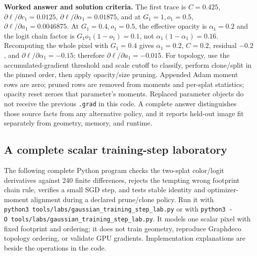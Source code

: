 \textbf{Worked answer and solution criteria.} The first trace is \(C=0.425\), \(\partial\ell/\partial c_1=0.0125\), \(\partial\ell/\partial\alpha_1=0.01875\), and at \(G_1=1,o_1=0.5\), \(\partial\ell/\partial a_1=0.0046875\). At \(G_1=0.4,o_1=0.5\), the effective opacity is \(\alpha_1=0.2\) and the logit chain factor is \(G_1o_1(1-o_1)=0.1\), not \(\alpha_1(1-\alpha_1)=0.16\). Recomputing the whole pixel with \(G_1=0.4\) gives \(\alpha_1=0.2\), \(C=0.2\), residual \(-0.2\), and \(\partial\ell/\partial\alpha_1=-0.15\); therefore \(\partial\ell/\partial a_1=-0.015\). For topology, use the accumulated-gradient threshold and scale cutoff to classify, perform clone/split in the pinned order, then apply opacity/size pruning. Appended Adam moment rows are zero; pruned rows are removed from moments and per-splat statistics; opacity reset zeroes that parameter's moments. Replaced parameter objects do not receive the previous \texttt{.grad} in this code. A complete answer distinguishes those source facts from any alternative policy, and it reports held-out image fit separately from geometry, memory, and runtime.

\subsection{A complete scalar training-step laboratory}\label{04-visual-computing-ii-ch039-a-complete-scalar-training-step-laboratory}

\hypertarget{04-visual-computing-ii-ch039-a-complete-scalar-training-step-laboratory}{}

The following complete Python program checks the two-splat color/logit derivatives against 240 finite differences, rejects the tempting wrong footprint chain rule, verifies a small SGD step, and tests stable identity and optimizer-moment alignment during a declared prune/clone policy. Run it with \texttt{python3\ tools/labs/gaussian\_training\_step\_lab.py} or with \texttt{python3\ -O\ tools/labs/gaussian\_training\_step\_lab.py}. It models one scalar pixel with fixed footprint and ordering; it does not train geometry, reproduce Graphdeco topology ordering, or validate GPU gradients. Implementation explanations are beside the operations in the code.

